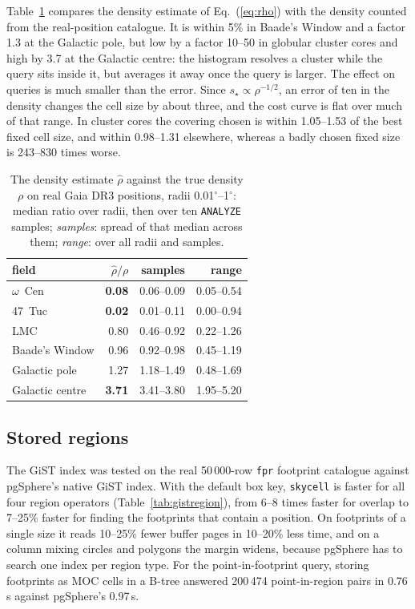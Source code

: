 \documentclass[preprint,12pt]{elsarticle}
\newcommand{\degr}{\ensuremath{^{\circ}}}
\begin{document}
Table~\ref{tab:estimator} compares the density estimate of Eq.~(\ref{eq:rho}) with the
density counted from the real-position catalogue. It is within 5\% in Baade's Window and a
factor 1.3 at the Galactic pole, but low by a factor 10--50 in globular cluster cores and
high by 3.7 at the Galactic centre: the histogram resolves a cluster while the query
sits inside it, but averages it away once the query is larger. The effect on queries is
much smaller than the error. Since $s_\star\propto\rho^{-1/2}$, an error of ten in the
density changes the cell size by about three, and the cost curve is flat over much of
that range. In cluster cores the covering chosen is within 1.05--1.53 of the best fixed
cell size, and within 0.98--1.31 elsewhere, whereas a badly chosen fixed size is
243--830 times worse.

\begin{table}
  \caption{The density estimate $\hat\rho$ against the true density $\rho$ on real Gaia
    DR3 positions, radii 0.01\degr--1\degr: median ratio over radii, then over ten
    \texttt{ANALYZE} samples; \emph{samples}: spread of that median across them;
    \emph{range}: over all radii and samples.}
  \label{tab:estimator}
  \centering
  \footnotesize
  \begin{tabular}{l rrr}
    \hline\hline
    field & $\hat\rho/\rho$ & samples & range \\
    \hline
    $\omega$~Cen           & \textbf{0.08} & 0.06--0.09 & 0.05--0.54 \\
    47~Tuc                 & \textbf{0.02} & 0.01--0.11 & 0.00--0.94 \\
    LMC                    & 0.80 & 0.46--0.92 & 0.22--1.26 \\
    Baade's Window         & 0.96 & 0.92--0.98 & 0.45--1.19 \\
    Galactic pole          & 1.27 & 1.18--1.49 & 0.48--1.69 \\
    Galactic centre        & \textbf{3.71} & 3.41--3.80 & 1.95--5.20 \\
    \hline
  \end{tabular}
\end{table}

\subsection{Stored regions}
\label{sec:tests-regions}

The GiST index was tested on the real 50\,000-row \texttt{fpr} footprint catalogue
against pgSphere's native GiST index. With the default box key, \texttt{skycell} is
faster for all four region operators (Table~\ref{tab:gistregion}), from 6--8 times
faster for overlap to 7--25\% faster for finding the footprints that contain a
position. On footprints of a single size it reads 10--25\% fewer buffer pages in
10--20\% less time, and on a column mixing circles and polygons the margin widens,
because pgSphere has to search one index per region type. For the point-in-footprint
query, storing footprints as MOC cells in a B-tree answered 200\,474 point-in-region
pairs in 0.76\,s against pgSphere's 0.97\,s.
\end{document}
